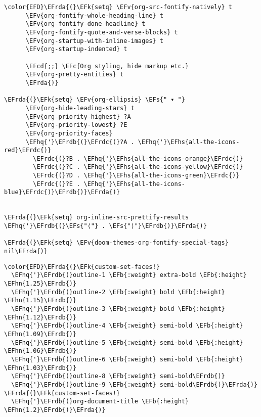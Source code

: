 \documentclass[c]{article}
\theoremstyle{plain}%
\theoremstyle{definition}
\theoremstyle{remark}
\newcommand{\EFc}[1]{\textcolor{EFc}{#1}} %
\newcommand{\EFcd}[1]{\textcolor{EFcd}{#1}} %
\newcommand{\EFs}[1]{\textcolor{EFs}{#1}} %
\newcommand{\EFk}[1]{\textcolor{EFk}{#1}} %
\newcommand{\EFb}[1]{\textcolor{EFb}{#1}} %
\newcommand{\EFv}[1]{\textcolor{EFv}{#1}} %
\newcommand{\EFhn}[1]{\textcolor{EFhn}{#1}} %
\newcommand{\EFhq}[1]{\textcolor{EFhq}{#1}} %
\newcommand{\EFhs}[1]{\textcolor{EFhs}{#1}} %
\newcommand{\EFrda}[1]{\textcolor{EFrda}{#1}} %
\newcommand{\EFrdb}[1]{\textcolor{EFrdb}{#1}} %
\newcommand{\EFrdc}[1]{\textcolor{EFrdc}{#1}} %
\begin{document}
\begin{Code}
\begin{Verbatim}
\color{EFD}\EFrda{(}\EFk{setq} \EFv{org-src-fontify-natively} t
      \EFv{org-fontify-whole-heading-line} t
      \EFv{org-fontify-done-headline} t
      \EFv{org-fontify-quote-and-verse-blocks} t
      \EFv{org-startup-with-inline-images} t
      \EFv{org-startup-indented} t

      \EFcd{;;} \EFc{Org styling, hide markup etc.}
      \EFv{org-pretty-entities} t
      \EFrda{)}

\EFrda{(}\EFk{setq} \EFv{org-ellipsis} \EFs{" ▾ "}
      \EFv{org-hide-leading-stars} t
      \EFv{org-priority-highest} ?A
      \EFv{org-priority-lowest} ?E
      \EFv{org-priority-faces}
      \EFhq{'}\EFrdb{(}\EFrdc{(}?A . \EFhq{'}\EFhs{all-the-icons-red}\EFrdc{)}
        \EFrdc{(}?B . \EFhq{'}\EFhs{all-the-icons-orange}\EFrdc{)}
        \EFrdc{(}?C . \EFhq{'}\EFhs{all-the-icons-yellow}\EFrdc{)}
        \EFrdc{(}?D . \EFhq{'}\EFhs{all-the-icons-green}\EFrdc{)}
        \EFrdc{(}?E . \EFhq{'}\EFhs{all-the-icons-blue}\EFrdc{)}\EFrdb{)}\EFrda{)}


\EFrda{(}\EFk{setq} org-inline-src-prettify-results \EFhq{'}\EFrdb{(}\EFs{"⟨"} . \EFs{"⟩"}\EFrdb{)}\EFrda{)}

\EFrda{(}\EFk{setq} \EFv{doom-themes-org-fontify-special-tags} nil\EFrda{)}
\end{Verbatim}
\end{Code}

\begin{Code}
\begin{Verbatim}
\color{EFD}\EFrda{(}\EFk{custom-set-faces!}
  \EFhq{'}\EFrdb{(}outline-1 \EFb{:weight} extra-bold \EFb{:height} \EFhn{1.25}\EFrdb{)}
  \EFhq{'}\EFrdb{(}outline-2 \EFb{:weight} bold \EFb{:height} \EFhn{1.15}\EFrdb{)}
  \EFhq{'}\EFrdb{(}outline-3 \EFb{:weight} bold \EFb{:height} \EFhn{1.12}\EFrdb{)}
  \EFhq{'}\EFrdb{(}outline-4 \EFb{:weight} semi-bold \EFb{:height} \EFhn{1.09}\EFrdb{)}
  \EFhq{'}\EFrdb{(}outline-5 \EFb{:weight} semi-bold \EFb{:height} \EFhn{1.06}\EFrdb{)}
  \EFhq{'}\EFrdb{(}outline-6 \EFb{:weight} semi-bold \EFb{:height} \EFhn{1.03}\EFrdb{)}
  \EFhq{'}\EFrdb{(}outline-8 \EFb{:weight} semi-bold\EFrdb{)}
  \EFhq{'}\EFrdb{(}outline-9 \EFb{:weight} semi-bold\EFrdb{)}\EFrda{)}
\EFrda{(}\EFk{custom-set-faces!}
  \EFhq{'}\EFrdb{(}org-document-title \EFb{:height} \EFhn{1.2}\EFrdb{)}\EFrda{)}
\end{Verbatim}
\end{Code}
\end{document}
